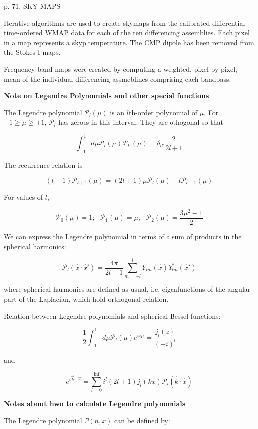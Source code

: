 \documentclass[a4paper, 11pt]{article}
\begin{document}
p. 71, SKY MAPS

Iterative algorithms are used to create skymaps from the calibrated differential time-ordered WMAP data for each of the ten differencing assemblies. Each pixel in a map represents a skyp temperature. The CMP dipole has been removed from the Stokes I maps. 

Frequency band maps were created by computing a weighted, pixel-by-pixel, mean of the individual differencing assmeblines comprising each bandpass. 


\textbf{Note on Legendre Polynomials and other special functions}

The Legendre polynomial $\mathcal{P}_l(\mu)$ is an $l$th-order polynomial of $\mu$. For $-1\geq\mu\geq+1$, $\mathcal{P}_l$ has zeroes in this interval. They are othogonal so that 

$$
\int^{1}_{-1}d\mu\mathcal{P}_l(\mu)\mathcal{P}_{l'}(\mu)=\delta_{ll'}\frac{2}{2l+1}
$$

The recurrence relation is

$$
(l+1)\mathcal{P}_{l+1}(\mu) = (2l+1)\mu\mathcal{P}_l(\mu) - l\mathcal{P}_{l-1}(\mu)
$$

For values of $l$, 

$$
\mathcal{P}_0(\mu)=1; \ \ \ \mathcal{P}_1(\mu) = \mu; \ \ \ \mathcal{P}_2(\mu) = \frac{3\mu^2-1}{2}
$$

We can express the Legendre polynomial in terms of a sum of products in the spherical harmonics:

$$
\mathcal{P}_l(\hat{x}\cdot\hat{x}')=\frac{4\pi}{2l+1}\sum^{l}_{m=-l}Y_{lm}(\hat{x})Y^{*}_{lm}(\hat{x}')
$$

where spherical harmonics are defined as usual, i.e. eigenfunctions of the angular part of the Laplacian, which hold orthogonal relation. 


Relation between Legendre polynomials and spherical Bessel functions:

$$
\frac{1}{2}\int^{1}_{-1}d\mu\mathcal{P}_l(\mu) e^{iz\mu} = \frac{j_l(z)}{(-i)^l}
$$

and


$$
e^{i\vec{k}\cdot\vec{x}} = \sum^{\inf}_{l=0} i^{l} (2l+1) j_{l}(kx)\mathcal{P}_l(\hat{k}\cdot\hat{x})
$$

\textbf{Notes about hwo to calculate Legendre polynomials}


The Legendre polynomial $P(n,x)$ can be defined by: 
\end{document}
